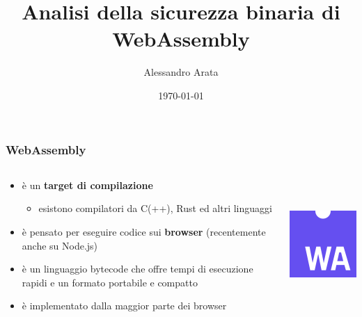 \documentclass{beamer}
\begin{document}
\title{Analisi della sicurezza binaria di WebAssembly}
\author{Alessandro Arata}
\date{\today}

\begin{frame}
  \titlepage
\end{frame}

\begin{frame}
  \frametitle{WebAssembly}
  \begin{columns}
    \begin{column}{0.6\textwidth}
      \begin{itemize}
        \item è un \textbf{target di compilazione}
        \begin{itemize}
          \item esistono compilatori da C(++), Rust ed altri linguaggi
        \end{itemize}
      \item è pensato per eseguire codice sui \textbf{browser} (recentemente anche su Node.js)

        \item è un linguaggio bytecode che offre tempi di esecuzione rapidi e un
        formato portabile e compatto
        \item è implementato dalla maggior parte dei browser
      \end{itemize}
    \end{column}
    \begin{column}{0.4\textwidth}
      \centerline{\includegraphics[width=4cm,height=5cm,keepaspectratio]{images/logo.png}}
    \end{column}
  \end{columns}
\end{frame}
\end{document}
